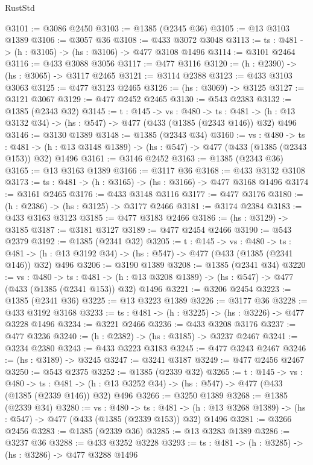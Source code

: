 \begin{lexlean}{RustStd}
\begin{coremodule}
{\begin{coremodule}
{{{{{{{@3101 := @3086 @2450
@3103 := @1385 (@2345 @36)
@3105 := @13 @3103 @1389
@3106 := @3057 @36
@3108 := @433 @3072 @3048
@3113 := {ts : @481} -> (h : @3105) -> (hs : @3106) -> @477 @3108 @1496
@3114 := @3101 @2464
@3116 := @433 @3088 @3056
@3117 := @477 @3116
@3120 := (h : @2390) -> (hs : @3065) -> @3117 @2465
@3121 := @3114 @2388
@3123 := @433 @3103 @3063
@3125 := @477 @3123 @2465
@3126 := (hs : @3069) -> @3125
@3127 := @3121 @3067
@3129 := @477 @2452 @2465
@3130 := @543 @2383
@3132 := @1385 (@2343 @32)
@3145 := {t : @145} ->
  {vs : @480} ->
  {ts : @481} -> (h : @13 @3132 @34) -> (hs : @547) -> @477 (@433 (@1385 (@2343 @146)) @32) @496
@3146 := @3130 @1389
@3148 := @1385 (@2343 @34)
@3160 := {vs : @480} ->
  {ts : @481} -> (h : @13 @3148 @1389) -> (hs : @547) -> @477 (@433 (@1385 (@2343 @153)) @32) @1496
@3161 := @3146 @2452
@3163 := @1385 (@2343 @36)
@3165 := @13 @3163 @1389
@3166 := @3117 @36
@3168 := @433 @3132 @3108
@3173 := {ts : @481} -> (h : @3165) -> (hs : @3166) -> @477 @3168 @1496
@3174 := @3161 @2465
@3176 := @433 @3148 @3116
@3177 := @477 @3176
@3180 := (h : @2386) -> (hs : @3125) -> @3177 @2466
@3181 := @3174 @2384
@3183 := @433 @3163 @3123
@3185 := @477 @3183 @2466
@3186 := (hs : @3129) -> @3185
@3187 := @3181 @3127
@3189 := @477 @2454 @2466
@3190 := @543 @2379
@3192 := @1385 (@2341 @32)
@3205 := {t : @145} ->
  {vs : @480} ->
  {ts : @481} -> (h : @13 @3192 @34) -> (hs : @547) -> @477 (@433 (@1385 (@2341 @146)) @32) @496
@3206 := @3190 @1389
@3208 := @1385 (@2341 @34)
@3220 := {vs : @480} ->
  {ts : @481} -> (h : @13 @3208 @1389) -> (hs : @547) -> @477 (@433 (@1385 (@2341 @153)) @32) @1496
@3221 := @3206 @2454
@3223 := @1385 (@2341 @36)
@3225 := @13 @3223 @1389
@3226 := @3177 @36
@3228 := @433 @3192 @3168
@3233 := {ts : @481} -> (h : @3225) -> (hs : @3226) -> @477 @3228 @1496
@3234 := @3221 @2466
@3236 := @433 @3208 @3176
@3237 := @477 @3236
@3240 := (h : @2382) -> (hs : @3185) -> @3237 @2467
@3241 := @3234 @2380
@3243 := @433 @3223 @3183
@3245 := @477 @3243 @2467
@3246 := (hs : @3189) -> @3245
@3247 := @3241 @3187
@3249 := @477 @2456 @2467
@3250 := @543 @2375
@3252 := @1385 (@2339 @32)
@3265 := {t : @145} ->
  {vs : @480} ->
  {ts : @481} -> (h : @13 @3252 @34) -> (hs : @547) -> @477 (@433 (@1385 (@2339 @146)) @32) @496
@3266 := @3250 @1389
@3268 := @1385 (@2339 @34)
@3280 := {vs : @480} ->
  {ts : @481} -> (h : @13 @3268 @1389) -> (hs : @547) -> @477 (@433 (@1385 (@2339 @153)) @32) @1496
@3281 := @3266 @2456
@3283 := @1385 (@2339 @36)
@3285 := @13 @3283 @1389
@3286 := @3237 @36
@3288 := @433 @3252 @3228
@3293 := {ts : @481} -> (h : @3285) -> (hs : @3286) -> @477 @3288 @1496
}}}}}}}
\end{coremodule}}
\end{coremodule}
\end{lexlean}
